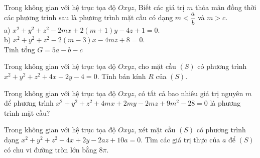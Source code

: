 \begin{ex}%
	Trong không gian với hệ trục tọa độ $Oxyz$, Biết các giá trị $m$ thỏa mãn đồng thời các phương trình sau là phương trình mặt cầu có dạng $m<\dfrac{a}{b}$ và $m>c$.\\
	a) $x^2+y^2+z^2-2mx+2(m+1)y-4z+1=0$.\\
	b) $x^2+y^2+z^2-2(m-3)x-4mz+8=0$.\\
	Tinh tổng $G=5a-b-c$
\end{ex}

\begin{ex}%
	Trong không gian với hệ trục tọa độ $Oxyz$, cho mặt cầu $(S)$ có phương trình $x^2+y^2+z^2+4x-2y-4=0$. Tính bán kính $R$ của $(S)$.
\end{ex}

\begin{ex}%
	Trong không gian với hệ trục tọa độ $Oxyz$, có tất cả bao nhiêu giá trị nguyên $m$ để phương trình $x^2+y^2+z^2+4mx+2my-2mz+9m^2-28=0$ là phương trình mặt cầu?
\end{ex}

\begin{ex}%
	Trong không gian với hệ trục tọa độ $Oxyz$, xét mặt cầu $(S)$ có phương trình dạng $x^2+y^2+z^2-4x+2y-2az+10a=0$. Tìm các giá trị thực của $a$ để $(S)$ có chu vi đường tròn lớn bằng $8\pi $.
\end{ex}

